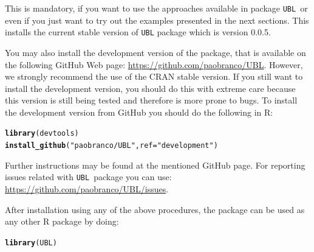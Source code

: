 \documentclass[10pt,a4paper]{article}\usepackage[]{graphicx}\usepackage[]{color}
\makeatletter
\newcommand{\hlstr}[1]{\textcolor[rgb]{0.192,0.494,0.8}{#1}}%
\newcommand{\hlstd}[1]{\textcolor[rgb]{0.345,0.345,0.345}{#1}}%
\newcommand{\hlkwc}[1]{\textcolor[rgb]{0.333,0.667,0.333}{#1}}%
\newcommand{\hlkwd}[1]{\textcolor[rgb]{0.737,0.353,0.396}{\textbf{#1}}}%
\newenvironment{kframe}{%
 \def\at@end@of@kframe{}%
 \ifinner\ifhmode%
  \def\at@end@of@kframe{\end{minipage}}%
  \begin{minipage}{\columnwidth}%
 \fi\fi%
 \def\FrameCommand##1{\hskip\@totalleftmargin \hskip-\fboxsep
 \colorbox{shadecolor}{##1}\hskip-\fboxsep
     \hskip-\linewidth \hskip-\@totalleftmargin \hskip\columnwidth}%
 \MakeFramed {\advance\hsize-\width
   \@totalleftmargin\z@ \linewidth\hsize
   \@setminipage}}%
 {\par\unskip\endMakeFramed%
 \at@end@of@kframe}
\newenvironment{knitrout}{}{} %
\newcommand{\pUBL}{package \texttt{UBL}\ }
\newcommand{\UBLp}{\texttt{UBL}\ package  }
\newcommand{\version}{0.0.5}
\makeatother
\begin{document}
This is mandatory, if you want to use the approaches available in \pUBL or even if you just want to try out the examples presented in the next sections. This installs the current stable version of \texttt{UBL} package which is version \version.

You may also install the development version of the package, that is available on the following GitHub Web page: \url{https://github.com/paobranco/UBL}. However, we strongly recommend the use of the CRAN stable version. If you still want to install the development version, you should do this with extreme care because this version is still being tested and therefore is more prone to bugs.
To install the development version from GitHub you should do the following in R:

\begin{knitrout}\footnotesize
{}\color{fgcolor}\begin{kframe}
\begin{alltt}
\hlkwd{library}\hlstd{(devtools)}
\hlkwd{install_github}\hlstd{(}\hlstr{"paobranco/UBL"}\hlstd{,}\hlkwc{ref}\hlstd{=}\hlstr{"development"}\hlstd{)}
\end{alltt}
\end{kframe}
\end{knitrout}

Further instructions may be found at the mentioned GitHub page. 
For reporting issues related with \UBLp you can use: \url{https://github.com/paobranco/UBL/issues}.


After installation using any of the above procedures, the package can be used as any other R package by doing:

\begin{knitrout}\footnotesize
{}\color{fgcolor}\begin{kframe}
\begin{alltt}
\hlkwd{library}\hlstd{(UBL)}
\end{alltt}
\end{kframe}
\end{knitrout}

\end{document}
